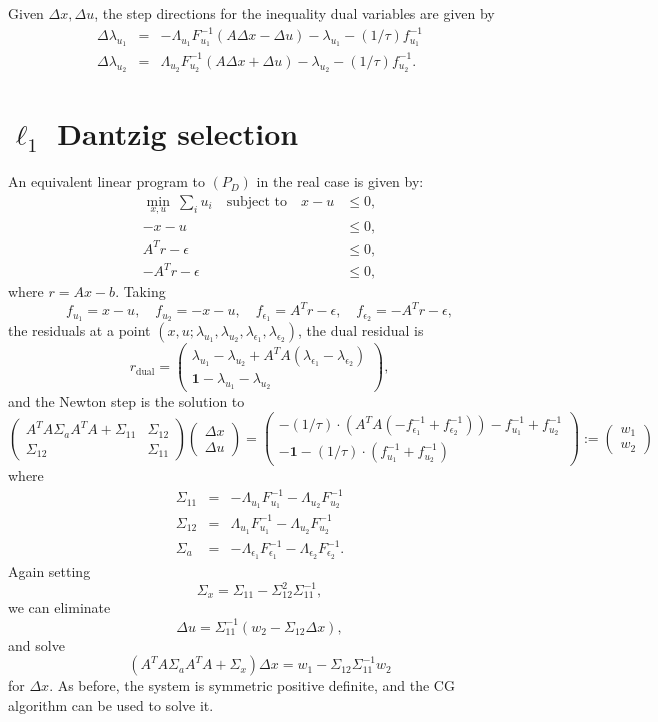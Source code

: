 \documentclass{article}
\newcommand{\bpm}{\left(\begin{matrix}}
\newcommand{\epm}{\end{matrix}\right)}
\newcommand{\dx}{\Delta x}
\newcommand{\du}{\Delta u}
\newcommand{\dlam}{\Delta\lambda}
\newcommand{\<}{\langle}
\renewcommand{\>}{\rangle}
\begin{document}
Given $\dx,\du$, the step directions for the inequality dual variables are given by
\begin{eqnarray*}
\dlam_{u_1} & = & 
-\Lambda_{u_1} F^{-1}_{u_1} (A\dx-\du) - \lambda_{u_1} - (1/\tau)f^{-1}_{u_1} \\
\dlam_{u_2} & = & 
\Lambda_{u_2} F^{-1}_{u_2}(A\dx+\du) - \lambda_{u_2} - (1/\tau)f^{-1}_{u_2}.
\end{eqnarray*}

\section{$\ell_1$ Dantzig selection}
\label{sec:l1dantzig}

An equivalent linear program to $(P_D)$ in the real case is given by:
\begin{align*}
\min_{x,u}~\sum_i u_i \quad\text{subject~to}\quad
 x - u & \leq 0, \\[-4mm]
 -x - u & \leq 0, \\
 A^T r - \epsilon & \leq 0, \\
 -A^T r - \epsilon & \leq 0,
\end{align*}
where $r = Ax-b$.  Taking
\[
f_{u_1} = x - u,\quad
f_{u_2} = -x -u,\quad
f_{\epsilon_1} = A^T r - \epsilon,\quad
f_{\epsilon_2} = -A^T r - \epsilon,
\]
the residuals at a point 
$(x,u;\lambda_{u_1},\lambda_{u_2},\lambda_{\epsilon_1},\lambda_{\epsilon_2})$, 
the dual residual is
\[
r_{\mathrm{dual}} = 
\bpm \lambda_{u_1}-\lambda_{u_2} + A^TA(\lambda_{\epsilon_1} - \lambda_{\epsilon_2})
\\ \mathbf{1} - \lambda_{u_1}-\lambda_{u_2}\epm, 
\]
and the Newton step is the solution to
\[
\bpm A^TA\Sigma_{a}A^TA + \Sigma_{11} & \Sigma_{12} \\ 
\Sigma_{12} &  \Sigma_{11}\epm 
\bpm \dx \\ \du \epm = 
\bpm -(1/\tau)\cdot (A^TA(-f^{-1}_{\epsilon_1} + f^{-1}_{\epsilon_2})) -
f^{-1}_{u_1} + f^{-1}_{u_2} \\ 
-\mathbf{1} - (1/\tau)\cdot(f^{-1}_{u_1} + f^{-1}_{u_2}) \epm :=
\bpm w_1 \\ w_2 \epm
\]
where
\begin{eqnarray*}
\Sigma_{11} & = & -\Lambda_{u_1}F^{-1}_{u_1} - \Lambda_{u_2}F^{-1}_{u_2} \\
\Sigma_{12} & = &  \Lambda_{u_1}F^{-1}_{u_1} - \Lambda_{u_2}F^{-1}_{u_2} \\
\Sigma_a & = & -\Lambda_{\epsilon_1}F^{-1}_{\epsilon_1} - \Lambda_{\epsilon_2}F^{-1}_{\epsilon_2}.
\end{eqnarray*}
Again setting
\[
\Sigma_x = \Sigma_{11} - \Sigma^2_{12}\Sigma^{-1}_{11},
\]
we can eliminate
\[
\du = \Sigma^{-1}_{11}(w_2 - \Sigma_{12}\dx),
\]
and solve
\[
(A^TA\Sigma_a A^TA + \Sigma_x)\dx = w_1 - \Sigma_{12}\Sigma^{-1}_{11}w_2
\]
for $\dx$.  As before, the system is symmetric positive definite, and the CG algorithm can be used to solve it.
\end{document}
